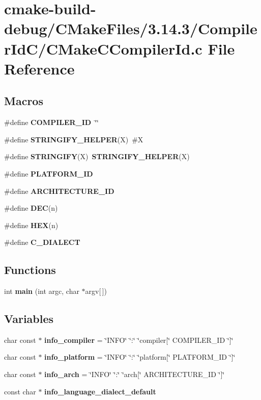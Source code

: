 \section{cmake-\/build-\/debug/\+C\+Make\+Files/3.14.3/\+Compiler\+Id\+C/\+C\+Make\+C\+Compiler\+Id.c File Reference}
\label{3_814_83_2_compiler_id_c_2_c_make_c_compiler_id_8c}
\subsection*{Macros}
\begin{DoxyCompactItemize}
\item 
\#define {\bf C\+O\+M\+P\+I\+L\+E\+R\+\_\+\+ID}~\char`\"{}\char`\"{}
\item 
\#define {\bf S\+T\+R\+I\+N\+G\+I\+F\+Y\+\_\+\+H\+E\+L\+P\+ER}(X)~\#X
\item 
\#define {\bf S\+T\+R\+I\+N\+G\+I\+FY}(X)~{\bf S\+T\+R\+I\+N\+G\+I\+F\+Y\+\_\+\+H\+E\+L\+P\+ER}(X)
\item 
\#define {\bf P\+L\+A\+T\+F\+O\+R\+M\+\_\+\+ID}
\item 
\#define {\bf A\+R\+C\+H\+I\+T\+E\+C\+T\+U\+R\+E\+\_\+\+ID}
\item 
\#define {\bf D\+EC}(n)
\item 
\#define {\bf H\+EX}(n)
\item 
\#define {\bf C\+\_\+\+D\+I\+A\+L\+E\+CT}
\end{DoxyCompactItemize}
\subsection*{Functions}
\begin{DoxyCompactItemize}
\item 
int {\bf main} (int argc, char $\ast$argv[$\,$])
\end{DoxyCompactItemize}
\subsection*{Variables}
\begin{DoxyCompactItemize}
\item 
char const $\ast$ {\bf info\+\_\+compiler} = \char`\"{}I\+N\+FO\char`\"{} \char`\"{}\+:\char`\"{} \char`\"{}compiler[\char`\"{} C\+O\+M\+P\+I\+L\+E\+R\+\_\+\+ID \char`\"{}]\char`\"{}
\item 
char const $\ast$ {\bf info\+\_\+platform} = \char`\"{}I\+N\+FO\char`\"{} \char`\"{}\+:\char`\"{} \char`\"{}platform[\char`\"{} P\+L\+A\+T\+F\+O\+R\+M\+\_\+\+ID \char`\"{}]\char`\"{}
\item 
char const $\ast$ {\bf info\+\_\+arch} = \char`\"{}I\+N\+FO\char`\"{} \char`\"{}\+:\char`\"{} \char`\"{}arch[\char`\"{} A\+R\+C\+H\+I\+T\+E\+C\+T\+U\+R\+E\+\_\+\+ID \char`\"{}]\char`\"{}
\item 
const char $\ast$ {\bf info\+\_\+language\+\_\+dialect\+\_\+default}
\end{DoxyCompactItemize}


